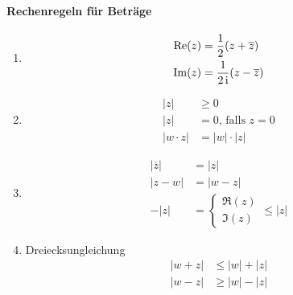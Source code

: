 \paragraph{Rechenregeln für Beträge}
\begin{enumerate}

\item
\begin{align*}
\operatorname{Re}(z) & = \frac{1}{2} (z+\overline{z}) \\
\operatorname{Im}(z) & = \frac{1}{2\operatorname{i}} (z - \overline{z})
\end{align*}

\item
\begin{align*}
|z| & \geq 0 \\
|z| & = 0 \text{, falls } z=0 \\
|w\cdot z| & = |w| \cdot |z|
\end{align*}

\item
\begin{align*}
|\overline{z}| & = |z| \\
|z - w| & = |w - z| \\
-|z| & = \begin{cases} \Re(z) \\ \Im(z) \end{cases} \leq |z|
\end{align*}

\item Dreiecksungleichung
\begin{align*}
|w + z| & \leq |w| + |z| \\
|w - z| & \geq |w| - |z|
\end{align*}
\end{enumerate}
\newpage
